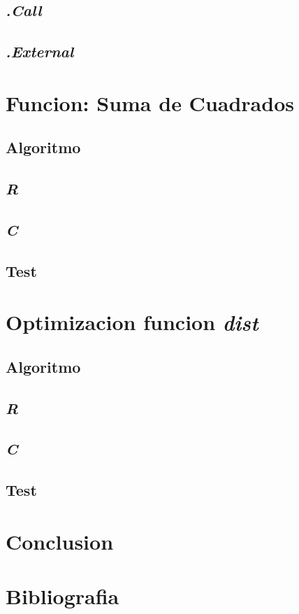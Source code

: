 \documentclass{article}
\begin{document}
    \subsection{\textit{.Call}}
    
    \subsection{\textit{.External}}

    \section{Funcion: Suma de Cuadrados}

    \subsection{Algoritmo}
    
    \subsection{\textit{R}}
    
    \subsection{\textit{C}}

    \subsection{Test}
    
    \section{Optimizacion funcion \textit{dist}}

    \subsection{Algoritmo}
    
    \subsection{\textit{R}}
    
    \subsection{\textit{C}}

    \subsection{Test}
    
    \section{Conclusion}

    \section{Bibliografia}
\end{document}
